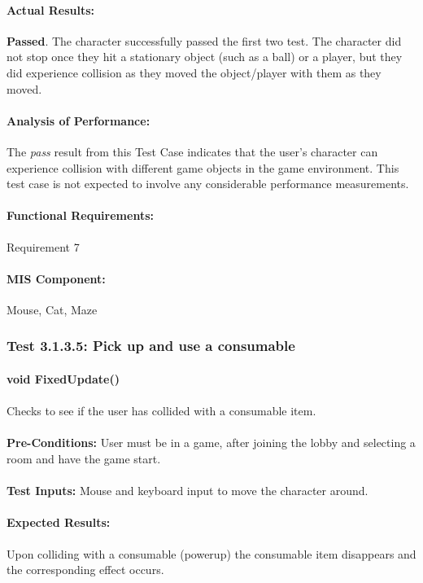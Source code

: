 \documentclass{article}
\begin{document}
    \paragraph{Actual Results:} \textbf{Passed}. The character successfully passed the first two test. The character did not stop once they hit a stationary object (such as a ball) or a player, but they did experience collision as they moved the object/player with them as they moved.
    \paragraph{Analysis of Performance:} The \emph{pass} result from this Test Case indicates that the user's character can experience collision with different game objects in the game environment. This test case is not expected to involve any considerable performance measurements.
    \paragraph{Functional Requirements:} Requirement 7
    \paragraph{MIS Component:} Mouse, Cat, Maze
    
    \subsubsection{Test 3.1.3.5: Pick up and use a consumable}
    \paragraph{}\textbf{void FixedUpdate()}
    \paragraph{} Checks to see if the user has collided with a consumable item.
    \paragraph{}\textbf{Pre-Conditions:} User must be in a game, after joining the lobby and selecting a room and have the game start.
    \paragraph{}\textbf{Test Inputs:} Mouse and keyboard input to move the character around.
    \paragraph{Expected Results:} Upon colliding with a consumable (powerup) the consumable item disappears and the corresponding effect occurs.
\end{document}
